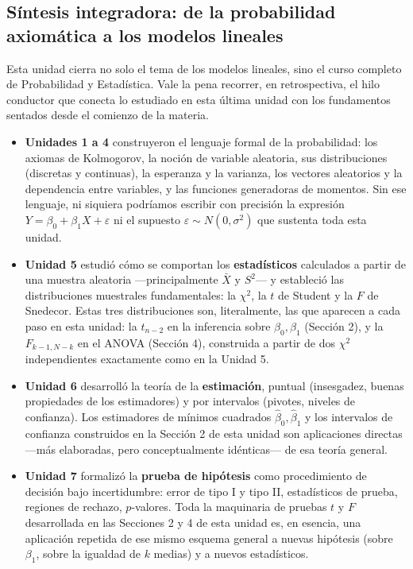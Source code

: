 \documentclass[11pt,a4paper]{article}
\theoremstyle{plain}
\theoremstyle{definition}
\theoremstyle{remark}
\begin{document}
\subsection{Síntesis integradora: de la probabilidad axiomática a los modelos lineales}

Esta unidad cierra no solo el tema de los modelos lineales, sino el curso completo de Probabilidad y Estadística. Vale la pena recorrer, en retrospectiva, el hilo conductor que conecta lo estudiado en esta última unidad con los fundamentos sentados desde el comienzo de la materia.

\begin{itemize}
\item \textbf{Unidades 1 a 4} construyeron el lenguaje formal de la probabilidad: los axiomas de Kolmogorov, la noción de variable aleatoria, sus distribuciones (discretas y continuas), la esperanza y la varianza, los vectores aleatorios y la dependencia entre variables, y las funciones generadoras de momentos. Sin ese lenguaje, ni siquiera podríamos escribir con precisión la expresión $Y=\beta_0+\beta_1X+\varepsilon$ ni el supuesto $\varepsilon\sim N(0,\sigma^2)$ que sustenta toda esta unidad.
\item \textbf{Unidad 5} estudió cómo se comportan los \textbf{estadísticos} calculados a partir de una muestra aleatoria —principalmente $\bar X$ y $S^2$— y estableció las distribuciones muestrales fundamentales: la $\chi^2$, la $t$ de Student y la $F$ de Snedecor. Estas tres distribuciones son, literalmente, las que aparecen a cada paso en esta unidad: la $t_{n-2}$ en la inferencia sobre $\beta_0,\beta_1$ (Sección 2), y la $F_{k-1,N-k}$ en el ANOVA (Sección 4), construida a partir de dos $\chi^2$ independientes exactamente como en la Unidad 5.
\item \textbf{Unidad 6} desarrolló la teoría de la \textbf{estimación}, puntual (insesgadez, buenas propiedades de los estimadores) y por intervalos (pivotes, niveles de confianza). Los estimadores de mínimos cuadrados $\hat\beta_0,\hat\beta_1$ y los intervalos de confianza construidos en la Sección 2 de esta unidad son aplicaciones directas —más elaboradas, pero conceptualmente idénticas— de esa teoría general.
\item \textbf{Unidad 7} formalizó la \textbf{prueba de hipótesis} como procedimiento de decisión bajo incertidumbre: error de tipo I y tipo II, estadísticos de prueba, regiones de rechazo, $p$-valores. Toda la maquinaria de pruebas $t$ y $F$ desarrollada en las Secciones 2 y 4 de esta unidad es, en esencia, una aplicación repetida de ese mismo esquema general a nuevas hipótesis (sobre $\beta_1$, sobre la igualdad de $k$ medias) y a nuevos estadísticos.

\end{itemize}
\end{document}
